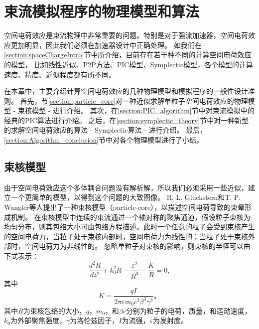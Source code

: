 
\chapter{束流模拟程序的物理模型和算法}
\label{chap:Algorithm}
空间电荷效应是束流物理中非常重要的问题。特别是对于强流加速器，空间电荷效应更加明显，因此我们必须在加速器设计中正确处理。
如我们在\eqref{section:spaceChargeIntro}节中所介绍，目前存在若干种不同的计算空间电荷效应的模型，
比如线性近似、P2P方法、PIC模型、Symplectic模型，各个模型的计算速度、精度、近似程度都有所不同。

在本章中，主要介绍计算空间电荷效应的几种物理模型和模拟程序的一般性设计准则。
首先，节\eqref{section:particle_core}对一种近似求解单粒子空间电荷效应的物理模型 - 束核模型 - 进行介绍。
其次，在\eqref{section:PIC_algorithm}节中对束流模拟中的经典的PIC算法进行介绍。
之后，在\eqref{section:symplectic_theory}节中对一种新型的求解空间电荷效应的算法 - Symplectic算法 - 进行介绍。
最后，\eqref{section:Algorithm_conclusion}节中对各个物理模型进行了小结。

\section{束核模型}            \label{section:particle_core}
由于空间电荷效应这个多体耦合问题没有解析解，所以我们必须采用一些近似，建立一个更简单的模型，以得到这个问题的大致图像。
R. L. Gluckstern和T. P. Wangler等人提出了一种束核模型（particle-core）\cite{gluckstern1994analytic,wangler1998particle}，以描述空间电荷导致的束晕形成机制\cite{chen1995self,okamoto1997simulation,gluckstern1998halo,fedotov1999halo,qiang2000beam}。
在束核模型中连续的束流通过一个轴对称的聚焦通道，假设粒子束核为均匀分布，则其包络大小可由包络方程描述。此时一个任意的粒子会受到束核产生的空间电荷力，当粒子处于束核内部时，空间电荷力为线性的；当粒子处于束核外部时，空间电荷力为非线性的。
忽略单粒子对束核的影响，则束核的半径可以由下式表示：
\begin{equation}
    \label{eq:particle_core_envelope}
    \frac{{{d}^{2}}R}{d{{z}^{2}}}+k_{0}^{2}R-\frac{{{\varepsilon }^{2}}}{{{R}^{3}}}-\frac{K}{R}=0,
\end{equation}
其中
\begin{equation}
K=\frac{qI}{2\pi \varepsilon {m_0}{{c}^{3}}{{\beta }^{3}}{{\gamma }^{3}}}\text{。}
\end{equation}
其中$R$为束核包络的大小，$q$，$m_0$，和$\beta c$分别为粒子的电荷，质量，和运动速度，$k_{0}$为外部聚焦强度，$\gamma$为洛伦兹因子，$I$为流强，$\varepsilon$为发射度。

